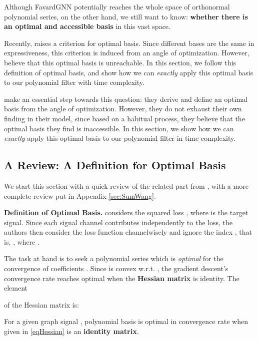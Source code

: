Although FavardGNN potentially reaches the whole space of orthonormal polynomial series, 
on the other hand, 
we still want to know: 
\textbf{whether there is an optimal and accessible basis} 
in this vast space. 


Recently, \citet{Wang2022jacobi} raises a criterion for 
optimal basis. Since different bases are the same in expressiveness,
this criterion is induced from an angle of optimization.
However, \citet{Wang2022jacobi} believe that this optimal basis 
is unreachable.
In this section, we follow this definition of optimal basis, 
and show how we can \textit{exactly} apply this optimal basis to our polynomial filter  
with  time complexity.



\citet{Wang2022jacobi} make an essential step towards this question: 
they derive and define an optimal basis from the angle of optimization. 
However, they do not exhaust their own finding in their model, 
since based on a habitual process, they believe that the optimal basis they find is inaccessible. 
In this section, we show how we can \textit{exactly} apply this optimal basis to our polynomial filter 
in  time complexity. 




\subsection{A Review: A Definition for Optimal Basis}
\label{sec:optdefinition}
We start this section with a quick review of the related part from \citet{Wang2022jacobi}, with a more complete review put in Appendix \ref{sec:SumWang}.

\textbf{Definition of Optimal Basis.\quad}
\label{sec:SumWang_short}
\citet{Wang2022jacobi} considers the squared loss 
, 
where  is the target signal.
Since each signal channel 
contributes independently to the loss, 
the authors then consider the loss function channelwisely and 
ignore the index , that is,
, 
where .

The task at hand is to seek a polynomial series  which is \textit{optimal} for the convergence of coefficients .
Since  is convex w.r.t. ,
the gradient descent's convergence rate reaches optimal 
when the {\textbf{Hessian matrix}} is identity. 
The  element 

of the Hessian matrix is:


\begin{tcolorbox}[boxrule=0.pt,height=18mm,valign=center,colback=blue!3!white]
    \begin{definition}
        For a given graph signal , polynomial basis  
        is optimal in convergence rate when 
        given in \eqref{eqHessian} is an \textbf{identity matrix}.
    \label{def:opt_basis}
    \end{definition}
\end{tcolorbox}

